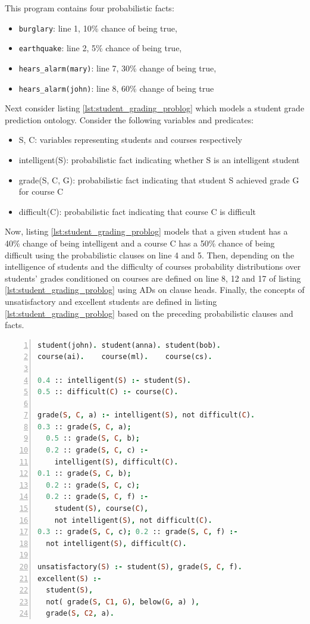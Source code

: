 This program contains four probabilistic facts: 
\begin{itemize}
  \item \texttt{burglary}: line 1, 10\% chance of being true,
  \item \texttt{earthquake}: line 2, 5\% chance of being true,
  \item \texttt{hears\_alarm(mary)}: line 7, 30\% change of being true,
  \item \texttt{hears\_alarm(john)}: line 8, 60\% change of being true
\end{itemize}

Next consider listing \ref{lst:student_grading_problog} which models a student grade prediction ontology. Consider the following variables and predicates:
\begin{itemize}
  \item S, C: variables representing students and courses respectively
  \item intelligent(S): probabilistic fact indicating whether S is an intelligent student
  \item grade(S, C, G): probabilistic fact indicating that student S achieved grade G for course C
  \item difficult(C): probabilistic fact indicating that course C is difficult
\end{itemize}
Now, listing \ref{lst:student_grading_problog} models that a given student has a 40\% change of being intelligent and a course C has a 50\% chance of being difficult using the probabilistic clauses on line 4 and 5. Then, depending on the intelligence of students and the difficulty of courses probability distributions over students' grades conditioned on courses are defined on line 8, 12 and 17 of listing \ref{lst:student_grading_problog} using ADs on clause heads. Finally, the concepts of unsatisfactory and excellent students are defined in listing \ref{lst:student_grading_problog} based on the preceding probabilistic clauses and facts.
\begin{lstlisting}[language=Prolog, caption={student\_grading.pl, the student grading problem}, numbers=left, label={lst:student_grading_problog}, captionpos=b]
student(john). student(anna). student(bob).
course(ai).    course(ml).    course(cs).
  
0.4 :: intelligent(S) :- student(S).
0.5 :: difficult(C) :- course(C).
  
grade(S, C, a) :- intelligent(S), not difficult(C).
0.3 :: grade(S, C, a);
  0.5 :: grade(S, C, b);
  0.2 :: grade(S, C, c) :-
    intelligent(S), difficult(C).
0.1 :: grade(S, C, b);
  0.2 :: grade(S, C, c);
  0.2 :: grade(S, C, f) :-
    student(S), course(C),
    not intelligent(S), not difficult(C).
0.3 :: grade(S, C, c); 0.2 :: grade(S, C, f) :-
  not intelligent(S), difficult(C).
  
unsatisfactory(S) :- student(S), grade(S, C, f).
excellent(S) :-
  student(S),
  not( grade(S, C1, G), below(G, a) ),
  grade(S, C2, a).
\end{lstlisting}

